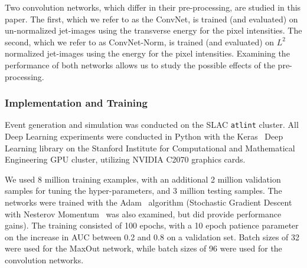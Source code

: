 Two convolution networks, which differ in their pre-processing, are studied in this paper.  The first, which we refer to as the ConvNet, is trained (and evaluated) on un-normalized jet-images using the transverse energy for the pixel intensities.  The second, which we refer to as ConvNet-Norm, is trained (and evaluated) on $L^{2}$ normalized jet-images using the energy for the pixel intensities.  Examining the performance of both networks allows us to study the possible effects of the pre-processing.




\subsubsection{Implementation and Training} %
\label{ssub:implementation_and_training}

Event generation and simulation was conducted on the SLAC \texttt{atlint} cluster. All Deep Learning experiments were conducted in Python with the Keras~\cite{Keras} Deep Learning library on the Stanford Institute for Computational and Mathematical Engineering GPU cluster, utilizing NVIDIA C2070 graphics cards. 

We used 8 million training examples, with an additional 2 million validation samples for tuning the hyper-parameters, and 3 million testing samples. The networks were trained with the Adam~\cite{DBLP:journals/corr/KingmaB14} algorithm (Stochastic Gradient Descent with Nesterov Momentum~\cite{Nesterov:1983wy} was also examined, but did provide performance gains).  The training consisted of 100 epochs, with a 10 epoch patience parameter on the increase in AUC between 0.2 and 0.8 on a validation set.  Batch sizes of 32 were used for the MaxOut network, while batch sizes of 96 were used for the convolution networks.


